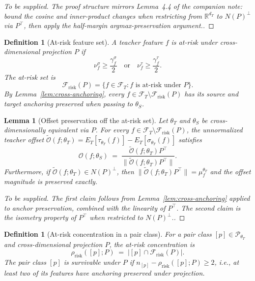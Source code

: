 \documentclass{article}
\newtheorem{lemma}[theorem]{Lemma}
\newtheorem{definition}[theorem]{Definition}
\newcommand{\Frisk}{\mathcal{F}_{\mathrm{risk}}}
\begin{document}
\begin{proof}
	[To be supplied. The proof structure mirrors Lemma~4.4 of the companion note: bound the cosine and inner-product changes when restricting from $\mathbb{R}^{d_T}$ to $N(P)^\perp$ via $P^\top$, then apply the half-margin argmax-preservation argument.]
\end{proof}

\begin{definition}[At-risk feature set]
	\label{def:atrisk}
	A teacher feature $f$ is \emph{at-risk} under cross-dimensional projection $P$ if
	\[
		\nu_f^\sigma \geq \frac{\gamma_f^\sigma}{2} \quad \text{or} \quad \nu_f^\tau \geq \frac{\gamma_f^\tau}{2}.
	\]
	The \emph{at-risk set} is
	\[
		\Frisk(P) = \{ f \in \mathcal{F}_T : f \text{ is at-risk under } P \}.
	\]
	By Lemma~\ref{lem:cross-anchoring}, every $f \in \mathcal{F}_T \setminus \Frisk(P)$ has its source and target anchoring preserved when passing to $\theta_S$.
\end{definition}

\begin{lemma}[Offset preservation off the at-risk set]
	\label{lem:offset-preservation}
	Let $\theta_T$ and $\theta_S$ be cross-dimensionally equivalent via $P$. For every $f \in \mathcal{F}_T \setminus \Frisk(P)$, the unnormalized teacher offset $\widetilde{\mathcal{O}}(f; \theta_T) = E_T[\tau_{\theta_T}(f)] - E_T[\sigma_{\theta_T}(f)]$ satisfies
	\[
		\mathcal{O}(f; \theta_S) \;=\; \frac{\widetilde{\mathcal{O}}(f; \theta_T) P^\top}{\big\|\widetilde{\mathcal{O}}(f; \theta_T) P^\top\big\|}.
	\]
	Furthermore, if $\widetilde{\mathcal{O}}(f; \theta_T) \in N(P)^\perp$, then $\big\|\widetilde{\mathcal{O}}(f; \theta_T) P^\top\big\| = \mu_f^{\theta_T}$ and the offset magnitude is preserved exactly.
\end{lemma}

\begin{proof}
	[To be supplied. The first claim follows from Lemma~\ref{lem:cross-anchoring} applied to anchor preservation, combined with the linearity of $P^\top$. The second claim is the isometry property of $P^\top$ when restricted to $N(P)^\perp$.]
\end{proof}

\begin{definition}[At-risk concentration in a pair class]
	\label{def:atrisk-concentration}
	For a pair class $[p] \in \mathcal{P}_{\theta_T}$ and cross-dimensional projection $P$, the \emph{at-risk concentration} is
	\[
		\rho_{\mathrm{risk}}([p]; P) \;=\; \big| [p] \cap \Frisk(P) \big|.
	\]
	The pair class $[p]$ is \emph{survivable} under $P$ if $n_{[p]} - \rho_{\mathrm{risk}}([p]; P) \geq 2$, i.e., at least two of its features have anchoring preserved under projection.
\end{definition}
\end{document}
